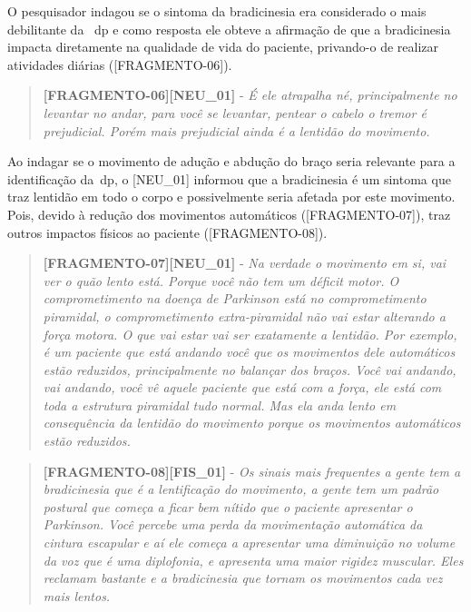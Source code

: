 O pesquisador indagou se o sintoma da bradicinesia era considerado o mais debilitante da ~\ac{dp} e como resposta ele obteve a afirmação de que a bradicinesia impacta diretamente na qualidade de vida do paciente, privando-o de realizar atividades diárias ([FRAGMENTO-06]).

\begin{quote}
\textbf{[FRAGMENTO-06][NEU\_01]} - 
\emph{
É ele atrapalha né, principalmente no levantar no andar, para você se levantar, pentear o cabelo o tremor é prejudicial. Porém mais prejudicial ainda é a lentidão do movimento.
}
\end{quote}

Ao indagar se o movimento de adução e abdução do braço seria relevante para a identificação da~\ac{dp}, o [NEU\_01] informou que a bradicinesia é um sintoma que traz lentidão em todo o corpo e possivelmente seria afetada por este movimento. Pois, devido à redução dos movimentos automáticos ([FRAGMENTO-07]), traz outros impactos físicos ao paciente ([FRAGMENTO-08]).

\begin{quote}
\textbf{[FRAGMENTO-07][NEU\_01]} - 
\emph{
Na verdade o movimento em si, vai ver o quão lento está. Porque você não tem um déficit motor. O comprometimento na doença de Parkinson está no comprometimento piramidal, o comprometimento extra-piramidal não vai estar alterando a força motora. O que vai estar vai ser exatamente a lentidão. Por exemplo, é um paciente que está andando você que os movimentos dele automáticos estão reduzidos, principalmente no balançar dos braços. Você vai andando, vai andando, você vê aquele paciente que está com a força, ele está com toda a estrutura piramidal tudo normal. Mas ela anda lento em consequência da lentidão do movimento porque os movimentos automáticos estão reduzidos.
}
\end{quote}


\begin{quote}
\textbf{[FRAGMENTO-08][FIS\_01]} - 
\emph{
Os sinais mais frequentes a gente tem a bradicinesia que é a lentificação do movimento, a gente tem um padrão postural que começa a ficar bem nítido que o paciente apresentar o Parkinson. Você percebe uma perda da movimentação automática da cintura escapular e aí ele começa a apresentar uma diminuição no volume da voz que é uma diplofonia, e apresenta uma maior rigidez muscular. Eles reclamam bastante e a bradicinesia que tornam os movimentos cada vez mais lentos.
}
\end{quote}

